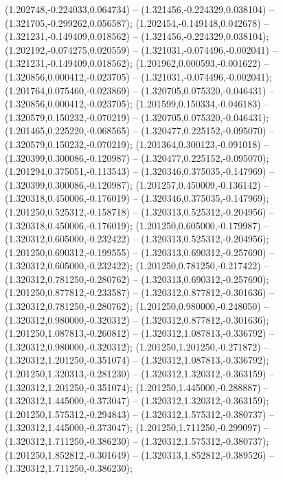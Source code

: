  (1.202748,-0.224033,0.064734) -- (1.321456,-0.224329,0.038104) -- (1.321705,-0.299262,0.056587);
 (1.202454,-0.149148,0.042678) -- (1.321231,-0.149409,0.018562) -- (1.321456,-0.224329,0.038104);
 (1.202192,-0.074275,0.020559) -- (1.321031,-0.074496,-0.002041) -- (1.321231,-0.149409,0.018562);
 (1.201962,0.000593,-0.001622) -- (1.320856,0.000412,-0.023705) -- (1.321031,-0.074496,-0.002041);
 (1.201764,0.075460,-0.023869) -- (1.320705,0.075320,-0.046431) -- (1.320856,0.000412,-0.023705);
 (1.201599,0.150334,-0.046183) -- (1.320579,0.150232,-0.070219) -- (1.320705,0.075320,-0.046431);
 (1.201465,0.225220,-0.068565) -- (1.320477,0.225152,-0.095070) -- (1.320579,0.150232,-0.070219);
 (1.201364,0.300123,-0.091018) -- (1.320399,0.300086,-0.120987) -- (1.320477,0.225152,-0.095070);
 (1.201294,0.375051,-0.113543) -- (1.320346,0.375035,-0.147969) -- (1.320399,0.300086,-0.120987);
 (1.201257,0.450009,-0.136142) -- (1.320318,0.450006,-0.176019) -- (1.320346,0.375035,-0.147969);
 (1.201250,0.525312,-0.158718) -- (1.320313,0.525312,-0.204956) -- (1.320318,0.450006,-0.176019);
 (1.201250,0.605000,-0.179987) -- (1.320312,0.605000,-0.232422) -- (1.320313,0.525312,-0.204956);
 (1.201250,0.690312,-0.199555) -- (1.320313,0.690312,-0.257690) -- (1.320312,0.605000,-0.232422);
 (1.201250,0.781250,-0.217422) -- (1.320312,0.781250,-0.280762) -- (1.320313,0.690312,-0.257690);
 (1.201250,0.877812,-0.233587) -- (1.320312,0.877812,-0.301636) -- (1.320312,0.781250,-0.280762);
 (1.201250,0.980000,-0.248050) -- (1.320312,0.980000,-0.320312) -- (1.320312,0.877812,-0.301636);
 (1.201250,1.087813,-0.260812) -- (1.320312,1.087813,-0.336792) -- (1.320312,0.980000,-0.320312);
 (1.201250,1.201250,-0.271872) -- (1.320312,1.201250,-0.351074) -- (1.320312,1.087813,-0.336792);
 (1.201250,1.320313,-0.281230) -- (1.320312,1.320312,-0.363159) -- (1.320312,1.201250,-0.351074);
 (1.201250,1.445000,-0.288887) -- (1.320312,1.445000,-0.373047) -- (1.320312,1.320312,-0.363159);
 (1.201250,1.575312,-0.294843) -- (1.320312,1.575312,-0.380737) -- (1.320312,1.445000,-0.373047);
 (1.201250,1.711250,-0.299097) -- (1.320312,1.711250,-0.386230) -- (1.320312,1.575312,-0.380737);
 (1.201250,1.852812,-0.301649) -- (1.320313,1.852812,-0.389526) -- (1.320312,1.711250,-0.386230);
